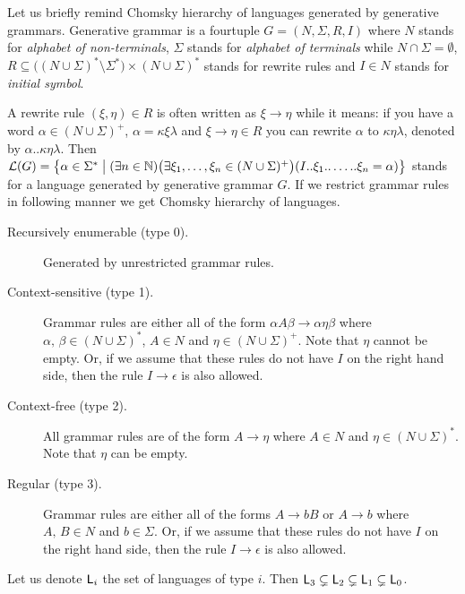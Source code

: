 		Let us briefly remind Chomsky hierarchy of languages generated by generative grammars. Generative grammar is a fourtuple $G = (N, \Sigma, R, I)$ where $N$ stands for {\em alphabet of non-terminals}, $\Sigma$ stands for {\em alphabet of terminals} while $N\cap\Sigma = \emptyset$, $R\subseteq\bigl((N\cup\Sigma)^*\setminus\Sigma^*\bigr) \times (N\cup\Sigma)^*$ stands for rewrite rules and $I\in N$ stands for {\em initial symbol}.
		
		A rewrite rule $(\xi,\eta)\in R$ is often written as $\xi\rightarrow\eta$ while it means: if you have a word $\alpha\in(N\cup\Sigma)^+$, $\alpha = \kappa\xi\lambda$ and $\xi\rightarrow\eta\in R$ you can rewrite $\alpha$ to $\kappa\eta\lambda$, denoted by $\alpha..\kappa\eta\lambda$.   %
		Then ${\cal L}(G) = \bigl\{ \alpha\in\Sigma^* \bigm| (\exists n\in\mathbb{N})\bigl(\exists \xi_1, \ldots, \xi_n \in(N\cup\Sigma)^+\bigr)(I..\xi_1..\ldots..\xi_n=\alpha) \bigr\}$ stands for a language generated by generative grammar $G$. If we restrict grammar rules in following manner we get Chomsky hierarchy of languages.
		\begin{description}
			\item[Recursively enumerable (type 0).] Generated by unrestricted grammar rules.
			\item[Context-sensitive (type 1).] Grammar rules are either all of the form $\alpha A \beta \rightarrow \alpha \eta \beta$ where $\alpha,\,\beta\in (N\cup\Sigma)^*$, $A\in N$ and $\eta\in (N\cup\Sigma)^+$. Note that $\eta$ cannot be empty. Or, if we assume that these rules do not have $I$ on the right hand side, then the rule $I\rightarrow \epsilon$ is also allowed.
			\item[Context-free (type 2).] All grammar rules are of the form $A\rightarrow\eta$ where $A\in N$ and $\eta\in (N\cup\Sigma)^*$. Note that $\eta$ can be empty.
			\item[Regular (type 3).] Grammar rules are either all of the forms $A\rightarrow bB$ or $A\rightarrow b$ where $A,\,B\in N$ and $b\in\Sigma$. Or, if we assume that these rules do not have $I$ on the right hand side, then the rule $I\rightarrow \epsilon$ is also allowed.
		\end{description}
		
		\begin{thm}
			Let us denote ${\sf L}_i$ the set of languages of type $i$. Then ${\sf L}_3\subsetneq{\sf L}_2\subsetneq{\sf L}_1\subsetneq{\sf L}_0$. 
		\end{thm}
		
